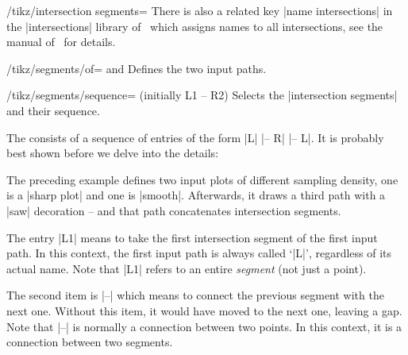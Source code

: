 {\begin{key}{/tikz/intersection segments=}
	There is also a related key |name intersections| in the |intersections| library of \tikzname\ which assigns names to all intersections, see the manual of \tikzname\ for details.
\end{key}

\begin{key}{/tikz/segments/of= and }
	Defines the two input paths.
\end{key}

\begin{key}{/tikz/segments/sequence= (initially L1 -- R2)}
	Selects the |intersection segments| and their sequence.

	The  consists of a sequence of entries of the form |L| |-- R| |-- L|. It is probably best shown before we delve into the details:
\begin{codeexample}[]
\end{codeexample}
	The preceding example defines two input plots of different sampling density, one is a |sharp plot| and one is |smooth|. Afterwards, it draws a third path with a |saw| decoration -- and that path concatenates intersection segments. 
	
	The entry |L1| means to take the first intersection segment of the first input path. In this context, the first input path is always called `|L|', regardless of its actual name. Note that |L1| refers to an entire \emph{segment} (not just a point). 
	
	The second item is |--| which means to connect the previous segment with the next one. Without this item, it would have moved to the next one, leaving a gap. Note that |--| is normally a connection between two points. In this context, it is a connection between two segments.
	

\end{key}}
